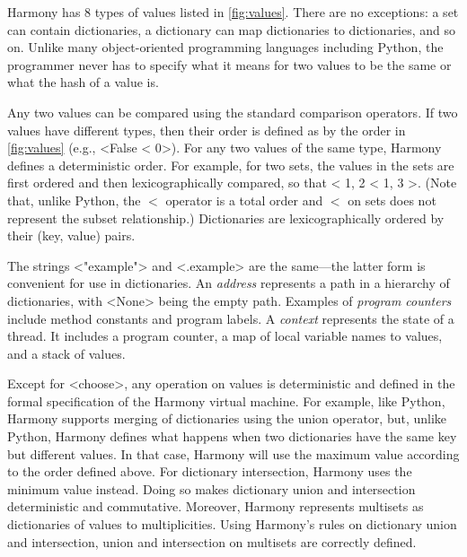 \documentclass[twocolumn]{article}
\begin{document}
Harmony has 8 types of values listed in \autoref{fig:values}.
There are no exceptions: a set can contain dictionaries, a dictionary
can map dictionaries to dictionaries, and so on.  Unlike many
object-oriented programming languages including Python, the programmer never
has to specify what it means for two values to be the same or what the
hash of a value is.

Any two values can be compared using the standard comparison operators.
If two values have different types, then their order is defined as by
the order in \autoref{fig:values} (e.g., <{False < 0}>).
For any two values of the same type, Harmony defines a deterministic order.
For example, for two sets, the values in the sets are first ordered and
then lexicographically compared, so that <{{ 1, 2 } < { 1, 3 }}>.
(Note that, unlike Python, the $<$ operator is a total order and
$<$ on sets does not represent the subset relationship.)
Dictionaries are lexicographically ordered by their (key, value) pairs.

The strings <{"example"}> and <{.example}> are the same---the latter
form is convenient for use in dictionaries.
An \emph{address} represents a path in a hierarchy of dictionaries, with
<{None}> being the empty path.
Examples of \emph{program counters} include method constants and program labels.
A \emph{context} represents the state of a thread.  It includes a program
counter, a map of local variable names to values, and a stack of values.

Except for <{choose}>, any operation on values is deterministic and
defined in the formal specification of the Harmony virtual machine.
For example, like Python, Harmony supports merging of dictionaries
using the union operator, but, unlike Python, Harmony defines
what happens when two dictionaries have the same key but different values.
In that case, Harmony will use the maximum value according to the order
defined above.
For dictionary  intersection, Harmony uses the minimum value instead.
Doing so makes dictionary union and intersection deterministic and
commutative.  Moreover, Harmony represents multisets as dictionaries
of values to multiplicities.  Using Harmony's rules on dictionary union
and intersection, union and intersection on multisets are correctly
defined.
\end{document}
